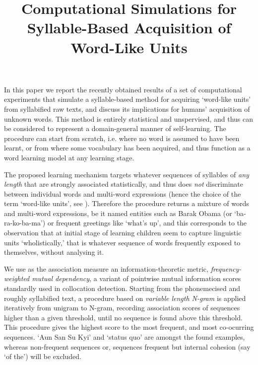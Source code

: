 \documentclass[a4,times]{article}
\title{Computational Simulations for\\ Syllable-Based Acquisition of Word-Like Units}
\date{}
\begin{document}
\maketitle
\thispagestyle{empty}

\vspace{-8mm}

In this paper we report the recently obtained results of a set of computational experiments that simulate a syllable-based method for acquiring `word-like units' from syllabified raw texts, and discuss its implications for humans' acquisition of unknown words. This method is entirely statistical and unspervised, and thus can be considered to represent a domain-general manner of self-learning. The procedure can start from scratch, i.e. where no word is assumed to have been learnt, or from where some vocabulary has been acquired, and thus function as a word learning model at any learning stage.

The proposed learning mechanism targets whatever sequences of syllables of \emph{any length} that are strongly associated statistically, and thus does \emph{not} discriminate between individual words and multi-word expressions (hence the choice of the term `word-like units', see \cite{EndressMehler09}). Therefore the procedure returns a mixture of words and multi-word expressions, be it named entities such as Barak Obama (or `ba-ra-ko-ba-ma') or frequent greetings like `what's up', and this corresponds to the observation that at initial stage of learning children seem to capture linguistic units `wholistically,' that is whatever sequence of words frequently exposed to themselves, without analysing it.

We use as the association measure an information-theoretic metric, \emph{frequency-weighted mutual dependency},\cite{Pecina09,ThanopoulosEtAl02} a variant of pointwise mutual information scores standardly used in collocation detection. Starting from the phonemecised and roughly syllabified text, a procedure based on \emph{variable length N-gram}\cite{KeplerEtAl12} is applied iteratively from unigram to N-gram, recording association scores of sequences higher than a given threshold, until no sequence is found above this threshold. This procedure gives the highest score to the most frequent, and most co-ocurring sequences. `Aun San Su Kyi' and `status quo' are amongst the found examples, whereas non-frequent sequences or, sequences frequent but internal cohesion (say `of the') will be excluded.
\end{document}
